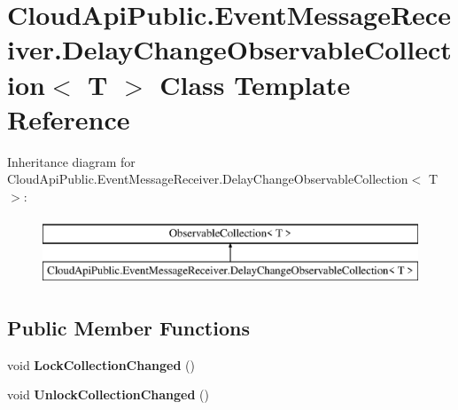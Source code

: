 \hypertarget{class_cloud_api_public_1_1_event_message_receiver_1_1_delay_change_observable_collection_3_01_t_01_4}{\section{Cloud\-Api\-Public.\-Event\-Message\-Receiver.\-Delay\-Change\-Observable\-Collection$<$ T $>$ Class Template Reference}
\label{class_cloud_api_public_1_1_event_message_receiver_1_1_delay_change_observable_collection_3_01_t_01_4}
}
Inheritance diagram for Cloud\-Api\-Public.\-Event\-Message\-Receiver.\-Delay\-Change\-Observable\-Collection$<$ T $>$\-:\begin{figure}[H]
\begin{center}
\leavevmode
\includegraphics[height=2.000000cm]{class_cloud_api_public_1_1_event_message_receiver_1_1_delay_change_observable_collection_3_01_t_01_4}
\end{center}
\end{figure}
\subsection*{Public Member Functions}
\begin{DoxyCompactItemize}
\item 
\hypertarget{class_cloud_api_public_1_1_event_message_receiver_1_1_delay_change_observable_collection_3_01_t_01_4_a4b90716c560ca172eaf189c45424565b}{void {\bfseries Lock\-Collection\-Changed} ()}\label{class_cloud_api_public_1_1_event_message_receiver_1_1_delay_change_observable_collection_3_01_t_01_4_a4b90716c560ca172eaf189c45424565b}

\item 
\hypertarget{class_cloud_api_public_1_1_event_message_receiver_1_1_delay_change_observable_collection_3_01_t_01_4_a7ea615bc737cefb30d1957c44aa8fb7f}{void {\bfseries Unlock\-Collection\-Changed} ()}\label{class_cloud_api_public_1_1_event_message_receiver_1_1_delay_change_observable_collection_3_01_t_01_4_a7ea615bc737cefb30d1957c44aa8fb7f}

\end{DoxyCompactItemize}

